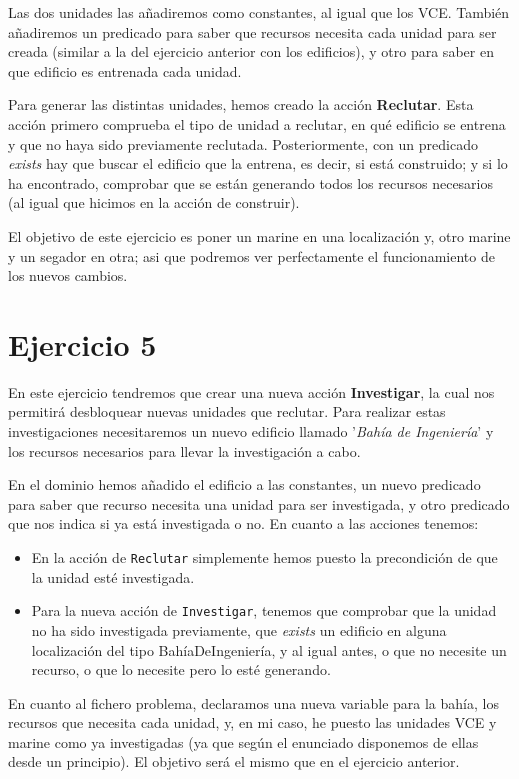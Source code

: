 \documentclass[11pt,a4paper]{article}
\begin{document}
Las dos unidades las añadiremos como constantes, al igual que los VCE. También añadiremos un predicado para saber que recursos
necesita cada unidad para ser creada (similar a la del ejercicio anterior con los edificios), y otro para saber en que edificio
es entrenada cada unidad.

Para generar las distintas unidades, hemos creado la acción \textbf{Reclutar}. Esta acción primero comprueba el tipo de unidad a
reclutar, en qué edificio se entrena y que no haya sido previamente reclutada. Posteriormente, con un predicado \textit{exists}
hay que buscar el edificio que la entrena, es decir, si está construido; y si lo ha encontrado, comprobar que se están generando
todos los recursos necesarios (al igual que hicimos en la acción de construir).

El objetivo de este ejercicio es poner un marine en una localización y, otro marine y un segador en otra; asi que podremos ver
perfectamente el funcionamiento de los nuevos cambios.


\section*{Ejercicio 5}
En este ejercicio tendremos que crear una nueva acción \textbf{Investigar}, la cual nos permitirá desbloquear nuevas unidades que
reclutar. Para realizar estas investigaciones necesitaremos un nuevo edificio llamado '\textit{Bahía de Ingeniería}' y los
recursos necesarios para llevar la investigación a cabo.

En el dominio hemos añadido el edificio a las constantes, un nuevo predicado para saber que recurso necesita una unidad para ser
investigada, y otro predicado que nos indica si ya está investigada o no. En cuanto a las acciones tenemos:

\begin{itemize}
    \item En la acción de \texttt{Reclutar} simplemente hemos puesto la precondición de que la unidad esté investigada.
    \item  Para la nueva acción de \texttt{Investigar}, tenemos que comprobar que la unidad no ha sido investigada previamente, que
           \textit{exists} un edificio en alguna localización del tipo BahíaDeIngeniería, y al igual antes, o que no necesite un
           recurso, o que lo necesite pero lo esté generando.
\end{itemize}

En cuanto al fichero problema, declaramos una nueva variable para la bahía, los recursos que necesita cada unidad, y, en mi caso,
he puesto las unidades VCE y marine como ya investigadas (ya que según el enunciado disponemos de ellas desde un principio). El
objetivo será el mismo que en el ejercicio anterior.
\end{document}
